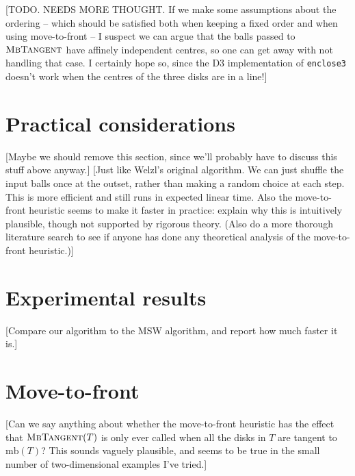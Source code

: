 \documentclass[a4paper]{article}
\newcommand\alg[1]{\mbox{\textsc{#1}}}
\newcommand\mb{\mathrm{mb}}
\begin{document}
[TODO. NEEDS  MORE THOUGHT. If we make some assumptions about the ordering -- which should be satisfied both when keeping a fixed order and when using move-to-front -- I suspect we can argue that the balls passed to $\alg{MbTangent}$ have affinely independent centres, so one can get away with not handling that case. I certainly hope so, since the D3 implementation of \texttt{enclose3} doesn’t work when the centres of the three disks are in a line!]

\section{Practical considerations}
[Maybe we should remove this section, since we'll probably have to discuss this stuff above anyway.]
[Just like Welzl’s original algorithm. We can just shuffle the input balls once at the outset, rather than making a random choice at each step. This is more efficient and still runs in expected linear time. Also the move-to-front heuristic seems to make it faster in practice: explain why this is intuitively plausible, though not supported by rigorous theory. (Also do a more thorough literature search to see if anyone has done any theoretical analysis of the move-to-front heuristic.)]

\section{Experimental results}
[Compare our algorithm to the MSW algorithm, and report how much faster it is.]

\section{Move-to-front}
[Can we say anything about whether the move-to-front heuristic has the effect that $\alg{MbTangent}(T)$ is only ever called when all the disks in $T$ are tangent to $\mb(T)$? This sounds vaguely plausible, and seems to be true in the small number of two-dimensional examples I've tried.]


\end{document}
